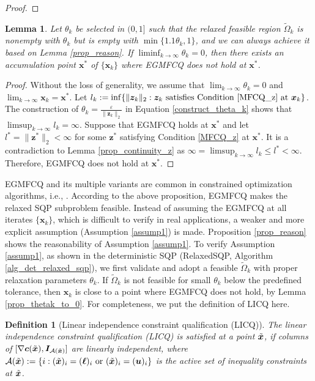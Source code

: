 \documentclass[aos]{imsart}
\numberwithin{equation}{section}
\theoremstyle{plain}
\newtheorem{definition}{Definition}
\newtheorem{lemma}{Lemma}
\begin{document}
\begin{appendix}
\begin{proof}
\end{proof}


\begin{lemma}
    Let $\theta_k$ be selected in $(0,1]$ such that the relaxed feasible region $\widetilde{\Omega}_k$ is nonempty with $\theta_k$ but is empty with $\min\{1.1\theta_k,1\}$, and we can always achieve it based on Lemma \ref{prop_reason}. If $\mathop{\lim \inf}_{k \to \infty} \theta_k = 0$, then there exists an accumulation point $\bm{x}^{*}$ of $\{\bm{x}_k\}$ where EGMFCQ does not hold at $\bm{x}^{*}$.
\end{lemma}


\begin{proof}
    Without the loss of generality, we assume that $\lim_{k \to \infty} \theta_k = 0$ and $\lim_{k \to \infty} \bm{x}_k = \bm{x}^{*}$. Let $l_k := \inf \{\|\bm{z}_k\|_2: \bm{z}_k~ \text{satisfies Condition \eqref{MFCQ_z} at}~ \bm{x}_k\}$. The construction of $\theta_k = \frac{\varepsilon}{\|\bm{z}_k\|_2}$ in Equation \eqref{construct_theta_k} shows that $\mathop{\lim \sup}_{k \to \infty} l_k = \infty$. Suppose that EGMFCQ holds at $\bm{x}^{*}$ and let $l^{*} = \|\bm{z}^{*}\|_2 < \infty$ for some $\bm{z}^{*}$ satisfying Condition \eqref{MFCQ_z} at $\bm{x}^{*}$. It is a contradiction to Lemma \ref{prop_continuity_z} as $\infty = \mathop{\lim \sup}_{k \to \infty} l_k \leq l^{*} < \infty$. Therefore, EGMFCQ does not hold at $\bm{x}^{*}$.
\end{proof}


EGMFCQ and its multiple variants are common in constrained optimization algorithms, i.e., \cite{burke1989robust, xu2015smoothing}. According to the above proposition, EGMFCQ makes the relaxed SQP subproblem feasible. Instead of assuming the EGMFCQ at all iterates $\{\bm{x}_k\}$, which is difficult to verify in real applications, a weaker and more explicit assumption (Assumption \ref{assump1}) is made. Proposition \ref{prop_reason} shows the reasonability of Assumption \ref{assump1}. To verify Assumption \ref{assump1}, as shown in the deterministic SQP (RelaxedSQP, Algorithm \ref{alg_det_relaxed_sqp}), we first validate and adopt a feasible $\widetilde{\Omega}_k$ with proper relaxation parameters $\theta_k$. If $\widetilde{\Omega}_k$ is not feasible for small $\theta_k$ below the predefined tolerance, then $\bm{x}_k$ is close to a point where EGMFCQ does not hold, by Lemma \ref{prop_thetak_to_0}. For completeness, we put the definition of LICQ here.

\begin{definition}
    [Linear independence constraint qualification (LICQ)]
    \label{definition_LICQ}
    The linear independence constraint qualification (LICQ) is satisfied at a point $\Tilde{\bm{x}}$, if columns of $[\nabla \bm{c}(\Tilde{\bm{x}}), \bm{I}_{\mathcal{A}(\Tilde{\bm{x}})}]$ are linearly independent, where $\mathcal{A}(\Tilde{\bm{x}}):=\{i: (\Tilde{\bm{x}})_i = (\bm{\ell})_i~\text{or}~(\Tilde{\bm{x}})_i = (\bm{u})_i\}$ is the active set of inequality constraints at $\Tilde{\bm{x}}$.
\end{definition}



\end{appendix}
\end{document}
